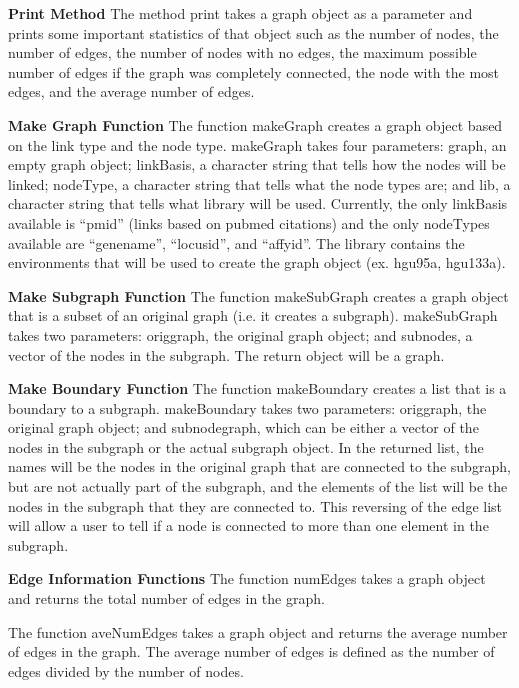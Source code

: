 \documentclass{article}[12pt]
\begin{document}
\noindent
{\bf Print Method}
\noindent
The method print takes a graph object as a parameter and prints some 
important statistics of that object such as the number of nodes, the 
number of edges, the number of nodes with no edges, the maximum possible
number of edges if the graph was completely connected, the node with the
most edges, and the average number of edges.


\noindent
{\bf Make Graph Function}
\noindent
The function makeGraph creates a graph object based on the link type and 
the node type.  makeGraph takes four parameters: graph, an empty graph
object; linkBasis, a character string that tells how the nodes will be
linked; nodeType, a character string that tells what the node types are;
and lib, a character string that tells what library will be used.  
Currently, the only linkBasis available is ``pmid'' (links based on 
pubmed citations) and the only nodeTypes available are ``genename'',
``locusid'', and ``affyid''.  The library contains the environments
that will be used to create the graph object (ex. hgu95a, hgu133a).


\noindent
{\bf Make Subgraph Function}
\noindent
The function makeSubGraph creates a graph object that is a subset of 
an original graph (i.e. it creates a subgraph).  makeSubGraph takes two
parameters: origgraph, the original graph object; and subnodes, 
a vector of the nodes in the subgraph.  The return object will be a graph.


\noindent
{\bf Make Boundary Function}
\noindent
The function makeBoundary creates a list that is a boundary to a subgraph.  
makeBoundary takes two parameters: origgraph, the original graph object; 
and subnodegraph, which can be either a vector of the nodes in the subgraph
or the actual subgraph object.  In the returned list, the names will be 
the nodes in the original graph that are connected to the subgraph, but 
are not actually part of the subgraph, and the elements of the list will 
be the nodes in the subgraph that they are connected to.  This reversing 
of the edge list will allow a user to tell if a node is connected to more 
than one element in the subgraph.


\noindent
{\bf Edge Information Functions }
\noindent
The function numEdges takes a graph object and returns the total
number of edges in the graph.


The function aveNumEdges takes a graph object and returns the average
number of edges in the graph.  The average number of edges is defined
as the number of edges divided by the number of nodes.
\end{document}
